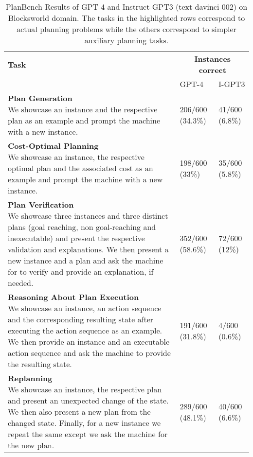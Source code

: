 \begin{table*}[t]
    \centering
    \small
     \caption{PlanBench Results of GPT-4 and Instruct-GPT3 (text-davinci-002) on Blocksworld domain. The tasks in the highlighted rows correspond to actual planning problems while the others correspond to simpler auxiliary planning tasks.}
    \label{tab:my_label}
    \begin{tabular}{p{10cm}  p{1.05cm}  p{1.2cm} }
    \toprule
        \textbf{Task} & \multicolumn{2}{c}{
        \centering
        \textbf{Instances correct}} \\ \cmidrule{2-3}
        & GPT-4 & I-GPT3 \\ \midrule[0.08em] 
        \rowcolor{backcolour}
        \specialcell{\textbf{Plan Generation} \\{\scriptsize We showcase an instance and the respective plan as an example and prompt the machine with a new instance. }} & 206/600 (34.3\%) & 41/600 (6.8\%) \\ \midrule[0.08em] 
        \rowcolor{backcolour}
        \specialcell{\textbf{Cost-Optimal Planning} \\{\scriptsize We showcase an instance, the respective optimal plan and the associated cost as an example and prompt the machine with a new instance. }} & 198/600 (33\%) & 35/600 (5.8\%)  \\ \midrule[0.08em] 
        \specialcell{\textbf{Plan Verification} \\{\scriptsize We showcase three instances and three distinct plans (goal reaching, non goal-reaching and inexecutable) and present the respective validation and explanations. We then present a new instance and a plan and ask the machine for to verify and provide an explanation, if needed.  }}  & 352/600 (58.6\%) & 72/600 (12\%) \\ \midrule[0.08em]
        \specialcell{\textbf{Reasoning About Plan Execution} \\{\scriptsize We showcase an instance, an action sequence and the corresponding resulting state after executing the action sequence as an example. We then provide an instance and an executable action sequence and ask the machine to provide the resulting state.}}  & 191/600 (31.8\%) & 4/600 (0.6\%) \\ \midrule[0.08em]
        \specialcell{\textbf{Replanning} \\{\scriptsize We showcase an instance, the respective plan and present an unexpected change of the state. We then also present a new plan from the changed state. Finally, for a new instance we repeat the same except we ask the machine for the new plan.  }}  & 289/600 (48.1\%) & 40/600 (6.6\%) \\ \midrule[0.08em]

\end{tabular}
\end{table*}
